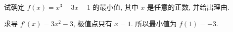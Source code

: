 \begin{prob}
\label{prob:prob-4}
试确定 $f(x) = x^3 - 3x - 1$ 的最小值,
其中 $x$ 是任意的正数, 并给出理由.
\end{prob}

\begin{soln}
求导 $f'(x) = 3x^2 - 3$, 极值点只有 $x = 1$.
所以最小值为 $f(1) = \boxed{-3}$.
\end{soln}
